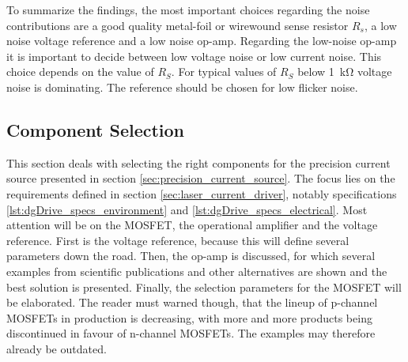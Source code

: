To summarize the findings, the most important choices regarding the noise contributions are a good quality metal-foil or wirewound sense resistor $R_s$, a low noise voltage reference and a low noise op-amp. Regarding the low-noise op-amp it is important to decide between low voltage noise or low current noise. This choice depends on the value of $R_S$. For typical values of $R_S$ below \qty{1}{\kilo\ohm} voltage noise is dominating. The reference should be chosen for low flicker noise.

\subsection{Component Selection}%
\label{sec:component_selection}
This section deals with selecting the right components for the precision current source presented in section \ref{sec:precision_current_source}. The focus lies on the requirements defined in section \ref{sec:laser_current_driver}, notably specifications \ref{lst:dgDrive_specs_environment} and \ref{lst:dgDrive_specs_electrical}. Most attention will be on the MOSFET, the operational amplifier and the voltage reference. First is the voltage reference, because this will define several parameters down the road. Then, the op-amp is discussed, for which several examples from scientific publications and other alternatives are shown and the best solution is presented. Finally, the selection parameters for the MOSFET will be elaborated. The reader must warned though, that the lineup of p-channel MOSFETs in production is decreasing, with more and more products being discontinued in favour of n-channel MOSFETs. The examples may therefore already be outdated.

